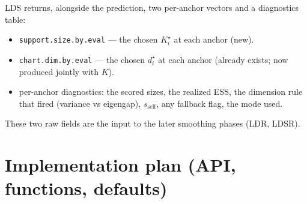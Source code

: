 \documentclass[11pt]{article}
\newcommand{\code}[1]{\texttt{#1}}
\begin{document}
LDS returns, alongside the prediction, two per-anchor vectors and a diagnostics
table:
\begin{itemize}[leftmargin=1.4em]
\item \code{support.size.by.eval} --- the chosen $K^\star_i$ at each anchor (new).
\item \code{chart.dim.by.eval} --- the chosen $d^\star_i$ at each anchor (already
exists; now produced jointly with $K$).
\item per-anchor diagnostics: the scored sizes, the realized ESS, the dimension rule
that fired (variance vs eigengap), $s_{\text{self}}$, any fallback flag, the mode used.
\end{itemize}
These two raw fields are the input to the later smoothing phases (LDR, LDSR).

\section{Implementation plan (API, functions, defaults)}\label{sec:impl}
\end{document}
